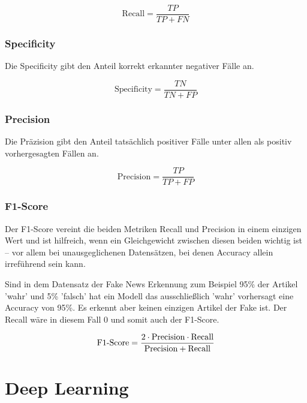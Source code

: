 \begin{equation}
    \text{Recall} = \frac{TP}{TP + FN}
\end{equation}

\subsubsection{Specificity}

Die Specificity gibt den Anteil korrekt erkannter negativer Fälle an.

\begin{equation}
    \text{Specificity} = \frac{TN}{TN + FP}
\end{equation}

\subsubsection{Precision}

Die Präzision gibt den Anteil tatsächlich positiver Fälle unter allen als positiv vorhergesagten Fällen an.

\begin{equation}
    \text{Precision} = \frac{TP}{TP + FP}
\end{equation}

\subsubsection{F1-Score}

Der F1-Score vereint die beiden Metriken Recall und Precision in einem einzigen Wert und ist hilfreich, wenn ein Gleichgewicht zwischen 
diesen beiden wichtig ist – vor allem bei unausgeglichenen Datensätzen, bei denen Accuracy allein irreführend sein kann.

Sind in dem Datensatz der Fake News Erkennung zum Beispiel 95\% der Artikel 'wahr' und 5\% 'falsch' hat ein Modell das ausschließlich
'wahr' vorhersagt eine Accuracy von 95\%. Es erkennt aber keinen einzigen Artikel der Fake ist.
Der Recall wäre in diesem Fall 0 und somit auch der F1-Score.

\begin{equation}
\text{F1\text{-}Score} = \frac{2 \cdot \text{Precision} \cdot \text{Recall}}{\text{Precision} + \text{Recall}}
\end{equation}


\section{Deep Learning}
\label{sec:deep_learning}

